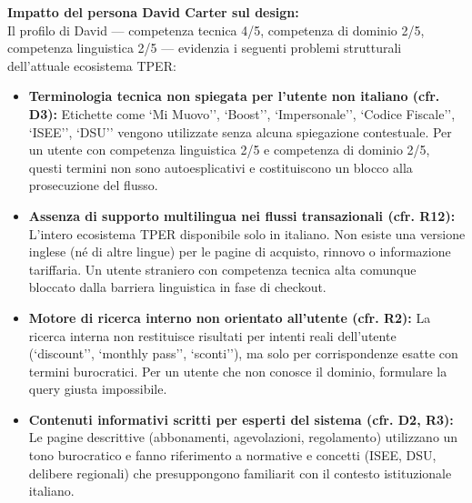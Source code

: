 \documentclass[11pt,a4paper]{article}
\begin{document}
\vspace{0.3cm}

\begin{tcolorbox}[colback=backgroundColor,colframe=borderColor,arc=2mm]
    {\small
    \textbf{Impatto del persona David Carter sul design:} \\[4pt]
    Il profilo di David --- competenza tecnica 4/5, competenza di dominio 2/5, competenza linguistica 2/5 --- evidenzia i seguenti problemi strutturali dell'attuale ecosistema TPER:
    \begin{itemize}[leftmargin=*]
        \item \textbf{Terminologia tecnica non spiegata per l'utente non italiano (cfr. D3):} Etichette come `Mi Muovo'', `Boost'', `Impersonale'', `Codice Fiscale'', `ISEE'', `DSU'' vengono utilizzate senza alcuna spiegazione contestuale. Per un utente con competenza linguistica 2/5 e competenza di dominio 2/5, questi termini non sono autoesplicativi e costituiscono un blocco alla prosecuzione del flusso.
        \item \textbf{Assenza di supporto multilingua nei flussi transazionali (cfr. R12):} L'intero ecosistema TPER \e disponibile solo in italiano. Non esiste una versione inglese (n\'e di altre lingue) per le pagine di acquisto, rinnovo o informazione tariffaria. Un utente straniero con competenza tecnica alta \e comunque bloccato dalla barriera linguistica in fase di checkout.
        \item \textbf{Motore di ricerca interno non orientato all'utente (cfr. R2):} La ricerca interna non restituisce risultati per intenti reali dell'utente (`discount'', `monthly pass'', `sconti''), ma solo per corrispondenze esatte con termini burocratici. Per un utente che non conosce il dominio, formulare la query giusta \e impossibile.
        \item \textbf{Contenuti informativi scritti per esperti del sistema (cfr. D2, R3):} Le pagine descrittive (abbonamenti, agevolazioni, regolamento) utilizzano un tono burocratico e fanno riferimento a normative e concetti (ISEE, DSU, delibere regionali) che presuppongono familiarit\ con il contesto istituzionale italiano.
    \end{itemize}
    }
\end{tcolorbox}

\vspace{0.3cm}
\end{document}
